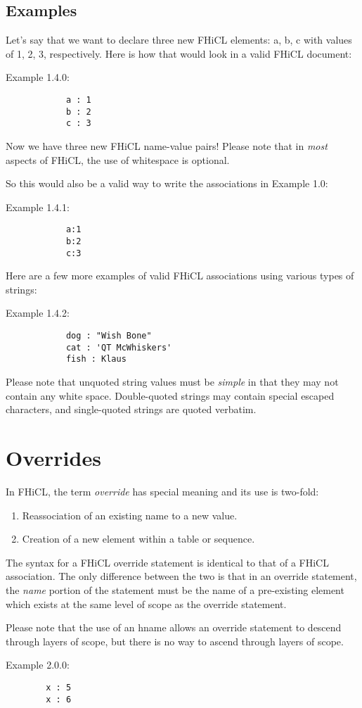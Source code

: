 \documentclass{memarticle}
\begin{document}
	\subsection{Examples}
		Let's say that we want to declare three new FHiCL elements: a, b, c
		with values of 1, 2, 3, respectively. 
		Here is how that would look in a valid FHiCL document:
		\par
		Example 1.4.0:
		\begin{verbatim}
			a : 1
			b : 2
			c : 3
		\end{verbatim}
		\par
		Now we have three new FHiCL name-value pairs!
		Please note that in \emph{most} aspects of FHiCL,
		the use of whitespace is optional.
		\par
		So this would also be a valid way to write the associations in Example 1.0:
		\par
		Example 1.4.1:
		\begin{verbatim}
			a:1
			b:2
			c:3
		\end{verbatim} 
 		\par
		Here are a few more examples of valid FHiCL associations using various types of strings:
		\par
		Example 1.4.2:
		\begin{verbatim}
			dog : "Wish Bone"
			cat : 'QT McWhiskers'
			fish : Klaus
		\end{verbatim}
		Please note that unquoted string values must be \emph{simple} in that they may not contain
		any white space.
		Double-quoted strings may contain special escaped characters,
		and single-quoted strings are quoted verbatim.
\section{Overrides}
	In FHiCL, the term \emph{override} has special meaning and its use is two-fold:
	\begin{enumerate}
		\item Reassociation of an existing name to a new value.
		\item Creation of a new element within a table or sequence.
	\end{enumerate}
	\par
	The syntax for a FHiCL override statement is identical to that of a FHiCL association.
	The only difference between the two is that in an override statement,
	the \emph{name} portion of the statement must be the name of a pre-existing element
	which exists at the same level of scope as the override statement.
	\par
	Please note that the use of an hname allows an override statement to descend through layers of scope,
	but there is no way to ascend through layers of scope.
	\par
	Example 2.0.0:
	\begin{verbatim}
		x : 5
		x : 6
	\end{verbatim}
\end{document}
